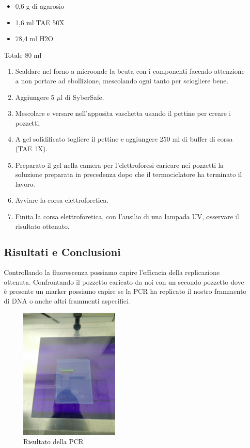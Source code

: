 \begin{itemize}
	\item 0,6 g  di agarosio
	\item 1,6  ml TAE 50X
	\item 78,4 ml H2O
\end{itemize}

Totale 80 ml
\begin{enumerate}
\item Scaldare nel forno a microonde la beuta con i componenti facendo attenzione a
non portare ad ebollizione, mescolando ogni tanto per sciogliere bene.
\item Aggiungere 5 $\mu$l di SyberSafe.
\item Mescolare e versare nell’apposita vaschetta
usando il pettine per creare i pozzetti.
\item A gel solidificato togliere il pettine e
aggiungere 250 ml di buffer di corsa (TAE 1X).

\item Preparato il gel nella camera per l’elettroforesi caricare nei pozzetti la
soluzione preparata in precedenza dopo che il termociclatore ha terminato il
lavoro.
\item Avviare la corsa elettroforetica.

\item Finita la corsa elettroforetica, con l’ausilio di una lampada UV, osservare il
risultato ottenuto.

\end{enumerate}


\subsection{Risultati e Conclusioni}

Controllando la fluorescenza possiamo capire l'efficacia della replicazione
ottenuta. Confrontando il pozzetto caricato da noi con un secondo pozzetto
dove è presente un marker possiamo capire se la PCR ha replicato il nostro
frammento di DNA o anche altri frammenti aspecifici.

\begin{figure}[htbp]
	\includegraphics[width=50mm]{./immagini/risultato_pcr.jpg}
	\caption{Risultato della PCR}
	\label{risultato_pcr}
\end{figure}
